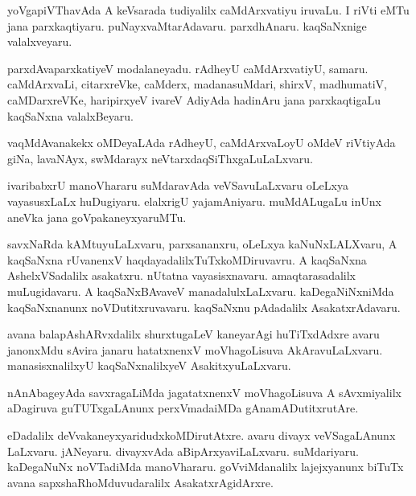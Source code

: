 \documentclass{article}
\begin{document}
\begin{mn}%
yoVgapiVThavAda A keVsarada tudiyalilx caMdArxvatiyu iruvaLu. I riVti eMTu jana 
parxkaqtiyaru. puNayxvaMtarAdavaru. parxdhAnaru. kaqSaNxnige valalxveyaru.
\end{mn}

\begin{mn}%
parxdAvaparxkatiyeV modalaneyadu. rAdheyU caMdArxvatiyU, samaru. caMdArxvaLi, citarxreVke, 
caMderx, madanasuMdari, shirxV, madhumatiV, caMDarxreVKe, haripirxyeV ivareV AdiyAda 
hadinAru jana parxkaqtigaLu kaqSaNxna valalxBeyaru.
\end{mn}

\begin{mn}%
vaqMdAvanakekx oMDeyaLAda rAdheyU, caMdArxvaLoyU oMdeV riVtiyAda giNa, lavaNAyx, swMdarayx 
neVtarxdaqSiThxgaLuLaLxvaru.
\end{mn}

\begin{mn}%
ivaribabxrU manoVhararu suMdaravAda veVSavuLaLxvaru oLeLxya vayasusxLaLx huDugiyaru. 
elalxrigU yajamAniyaru. muMdALugaLu inUnx aneVka jana goVpakaneyxyaruMTu.
\end{mn}

\begin{mn}%
savxNaRda kAMtuyuLaLxvaru, parxsananxru, oLeLxya kaNuNxLALXvaru, A kaqSaNxna rUvanenxV 
haqdayadalilxTuTxkoMDiruvavru. A kaqSaNxna AshelxVSadalilx asakatxru. nUtatna 
vayasisxnavaru. amaqtarasadalilx muLugidavaru. A kaqSaNxBAvaveV manadalulxLaLxvaru. 
kaDegaNiNxniMda kaqSaNxnanunx noVDutitxruvavaru. kaqSaNxnu pAdadalilx AsakatxrAdavaru.
\end{mn}

\begin{mn}%
avana balapAshARvxdalilx shurxtugaLeV kaneyarAgi huTiTxdAdxre avaru janonxMdu sAvira 
janaru hatatxnenxV moVhagoLisuva AkAravuLaLxvaru. manasisxnalilxyU kaqSaNxnalilxyeV 
AsakitxyuLaLxvaru.
\end{mn}

\begin{mn}%
nAnAbageyAda savxragaLiMda jagatatxnenxV moVhagoLisuva A sAvxmiyalilx aDagiruva 
guTUTxgaLAnunx perxVmadaiMDa gAnamADutitxrutAre.
\end{mn}

\begin{mn}%
eDadalilx deVvakaneyxyaridudxkoMDirutAtxre.  avaru divayx veVSagaLAnunx LaLxvaru. 
jANeyaru. divayxvAda aBipArxyaviLaLxvaru. suMdariyaru. kaDegaNuNx noVTadiMda manoVhararu. 
goVviMdanalilx lajejxyanunx biTuTx avana sapxshaRhoMduvudaralilx AsakatxrAgidArxre.
\end{mn}
\end{document}
